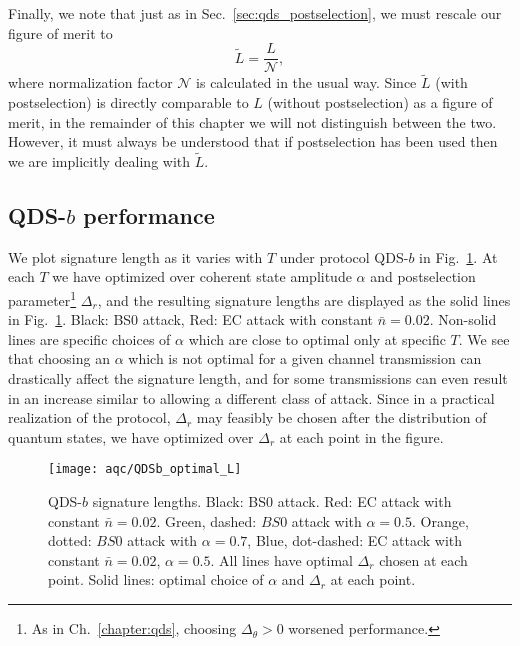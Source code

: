 \noindent Finally, we note that just as in Sec.~\ref{sec:qds_postselection}, we must rescale our figure of merit to
\begin{equation}
\tilde{L} = \frac{L}{\mathcal{N}},
\end{equation}
where normalization factor $\mathcal{N}$ is calculated in the usual way. Since $\tilde{L}$ (with postselection) is directly comparable to $L$ (without postselection) as a figure of merit, in the remainder of this chapter we will not distinguish between the two. However, it must always be understood that if postselection has been used then we are implicitly dealing with $\tilde{L}$.





\subsection{QDS-$b$ performance}

We plot signature length as it varies with $T$ under protocol QDS-$b$ in Fig.~\ref{fig:aqc_qdsb_lengths}. At each $T$ we have optimized over coherent state amplitude $\alpha$ and postselection parameter\footnote{As in Ch.~\ref{chapter:qds}, choosing $\Delta_\theta>0$ worsened performance.} $\Delta_r$, and the resulting signature lengths are displayed as the solid lines in Fig.~\ref{fig:aqc_qdsb_lengths}. Black: BS$0$ attack, Red: EC attack with constant $\bar{n}=0.02$. Non-solid lines are specific choices of $\alpha$ which are close to optimal only at specific $T$. We see that choosing an $\alpha$ which is not optimal for a given channel transmission can drastically affect the signature length, and for some transmissions can even result in an increase similar to allowing a different class of attack. Since in a practical realization of the protocol, $\Delta_r$ may feasibly be chosen after the distribution of quantum states, we have optimized over $\Delta_r$ at each point in the figure.

\begin{figure}[htp]
\captionsetup{width=0.8\linewidth}
\centering
\texttt{[image: aqc/QDSb\_optimal\_L]}
\caption{\label{fig:aqc_qdsb_lengths} QDS-$b$ signature lengths. Black: BS$0$ attack. Red: EC attack with constant $\bar{n} = 0.02$. Green, dashed: $BS0$ attack with $\alpha=0.5$. Orange, dotted: $BS0$ attack with $\alpha=0.7$, Blue, dot-dashed: EC attack with constant $\bar{n}=0.02$, $\alpha=0.5$. All lines have optimal $\Delta_r$ chosen at each point. Solid lines: optimal choice of $\alpha$ and $\Delta_r$ at each point.}
\end{figure}

